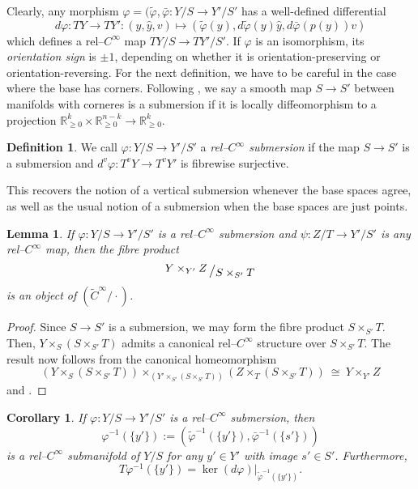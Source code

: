 \documentclass[11pt,psamsfonts, oneside, reqno]{amsart}
\newcommand{\modulo}[2]{{\raisebox{.2em}{$#1$}\left/\raisebox{-.2em}{$#2$}\right.}}%
\newcommand{\inv}{^{-1}}
\newcommand{\cl}{\colon}
\newcommand{\bR}{\mathbb{R}}
\newcommand{\wt}{\widetilde}
\newtheorem{lemma}[theorem]{Lemma}
\newtheorem{cor}[theorem]{Corollary}
\theoremstyle{definition}
\newtheorem{definition}[theorem]{Definition}
\theoremstyle{remark}
\numberwithin{equation}{section}
\begin{document}
\noindent
Clearly, any morphism $\varphi = (\wt\varphi,\bar{\varphi}\cl Y/S\to Y'/S'$ has a well-defined differential 
\begin{equation}\label{eq:differential}d\varphi \cl TY\to TY' : (y,\hat{y},v)\mapsto (\wt\varphi(y), d\wt\varphi(y)\hat{y},d\bar{\varphi}(p(y))v) \end{equation}
which defines a rel--$C^\infty$ map $TY/S\to TY'/S'$. If $\varphi$ is an isomorphism, its \emph{orientation sign} is $\pm 1$, depending on whether it is orientation-preserving or orientation-reversing. For the next definition, we have to be careful in the case where the base has corners. Following \cite{ST16}, we say a smooth map $S\to S'$ between manifolds with corneres is a submersion if it is locally diffeomorphism to a projection $\bR_{\geq 0}^{k}\times\bR_{\geq 0}^{n-k}\to \bR_{\ge 0}^k$.


\begin{definition}\label{de:submersion} We call $\varphi \cl Y/S\to Y'/S'$ a \emph{rel--$C^\infty$ submersion} if the map $S\to S'$ is a submersion and $d^v\varphi\cl T^vY\to T^vY'$ is fibrewise surjective.
\end{definition}

\noindent
This recovers the notion of a vertical submersion whenever the base spaces agree, as well as the usual notion of a submersion when the base spaces are just points.

\begin{lemma}\label{lem:fibre-product} If $\varphi \cl Y/S\to Y'/S'$ is a rel--$C^\infty$ submersion and $\psi \cl Z/T\to Y'/S'$ is any rel--$C^\infty$ map, then the fibre product 
	$$\modulo{Y\times_{Y'}Z}{S\times_{S'}T}$$
	is an object of $(\wt{C}^\infty/\cdot)$. 
\end{lemma}

\begin{proof}
	Since $S \rightarrow S'$ is a submersion, we may form the fibre product $S \times_{S'} T$. Then, $Y\times_S(S\times_{S'}T)$ admits a canonical rel--$C^\infty$ structure over $S\times_{S'} T$. The result now follows from the canonical homeomorphism
	\[
	(Y \times_{S} (S \times_{S'} T)) \times_{(Y' \times_{S'} (S \times_{S'} T))} (Z \times_T (S \times_{S'} T)) \ \cong\ Y \times_{Y'} Z
	\]
	and \cite[Lemma~5.7]{Swa21}.
\end{proof}

\begin{cor}\label{cor:fibre-of-submersion} If $\varphi \cl Y/S\to Y'/S'$ is a rel--$C^\infty$ submersion, then $$\varphi\inv(\{y'\}) := (\wt\varphi\inv(\{y'\}),\bar\varphi\inv(\{s'\}))$$ 
	is a rel--$C^\infty$ submanifold of $Y/S$ for any $y'\in Y'$ with image $s'\in S'$. Furthermore, $$T\varphi\inv(\{y'\}) = \ker(d\varphi)|_{\wt\varphi\inv(\{y'\})}.$$
\end{cor}
\end{document}
